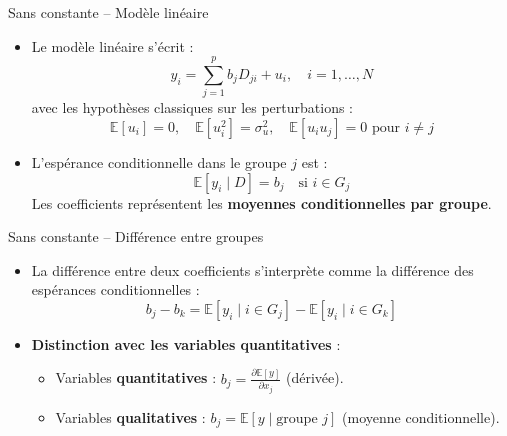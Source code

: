 \documentclass[11pt,aspectratio=169]{beamer}
\newcommand{\E}{\mathbb{E}}
\begin{document}
\begin{frame}{Sans constante -- Modèle linéaire}

\begin{itemize}

\item Le modèle linéaire s'écrit :
  \[
  y_i = \sum_{j=1}^{p} b_j D_{ji} + u_i, \quad i = 1, \ldots, N
  \]
  avec les hypothèses classiques sur les perturbations :
  \[
  \E[u_i] = 0, \quad \E[u_i^2] = \sigma_u^2, \quad \E[u_i u_j] = 0 \text{ pour } i \neq j
  \]\newline

\item L'espérance conditionnelle dans le groupe $j$ est :
  \[
  \boxed{\E[y_i \mid D] = b_j \quad \text{si } i \in G_j}
  \]
  Les coefficients représentent les \textbf{moyennes conditionnelles par groupe}.

\end{itemize}

\end{frame}

\begin{frame}{Sans constante -- Différence entre groupes}

\begin{itemize}

\item La différence entre deux coefficients s'interprète comme la différence des espérances conditionnelles :
  \[
  b_j - b_k = \E[y_i \mid i \in G_j] - \E[y_i \mid i \in G_k]
  \]\newline

\item \textbf{Distinction avec les variables quantitatives} :
  \begin{itemize}
  \item Variables \textbf{quantitatives} : $b_j = \frac{\partial \E[y]}{\partial x_j}$ (dérivée).
  \item Variables \textbf{qualitatives} : $b_j = \E[y \mid \text{groupe } j]$ (moyenne conditionnelle).
  \end{itemize}

\end{itemize}

\end{frame}
\end{document}
